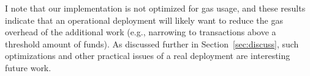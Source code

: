 I note that our implementation is not optimized for gas usage, and
these results indicate that an
operational deployment
will likely want to reduce the gas overhead of
the additional work (e.g., narrowing to transactions above a threshold
amount of funds).  As discussed further in Section~\ref{sec:discuss},
such optimizations and other practical issues of a real deployment are
interesting future work.

